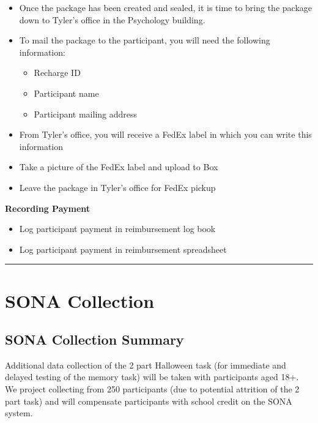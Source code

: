 \documentclass[]{book}
\providecommand{\tightlist}{%
  \setlength{\itemsep}{0pt}\setlength{\parskip}{0pt}}
\begin{document}
\begin{itemize}
\tightlist
\item
  Once the package has been created and sealed, it is time to bring the package down to Tyler's office in the Psychology building.
\item
  To mail the package to the participant, you will need the following information:

  \begin{itemize}
  \tightlist
  \item
    Recharge ID
  \item
    Participant name
  \item
    Participant mailing address
  \end{itemize}
\item
  From Tyler's office, you will receive a FedEx label in which you can write this information
\item
  Take a picture of the FedEx label and upload to Box
\item
  Leave the package in Tyler's office for FedEx pickup
\end{itemize}

\textbf{Recording Payment}

\begin{itemize}
\tightlist
\item
  Log participant payment in reimbursement log book
\item
  Log participant payment in reimbursement spreadsheet
\end{itemize}

\begin{center}\rule{0.5\linewidth}{0.5pt}\end{center}

\hypertarget{sona-collection}{%
\chapter{SONA Collection}\label{sona-collection}}

\hypertarget{sona-collection-summary}{%
\section{SONA Collection Summary}\label{sona-collection-summary}}

Additional data collection of the 2 part Halloween task (for immediate and delayed testing of the memory task) will be taken with participants aged 18+. We project collecting from 250 participants (due to potential attrition of the 2 part task) and will compensate participants with school credit on the SONA system.
\end{document}
